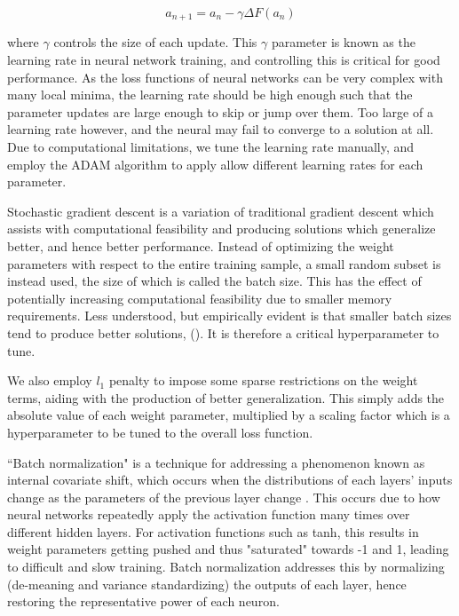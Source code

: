 \documentclass[11pt, a4paper, table]{article}
\begin{document}
\begin{equation}
	a_{n+1} = a_n - \gamma \Delta F(a_n)
\end{equation}

where $\gamma$ controls the size of each update. This $\gamma$ parameter is known as the learning rate in neural network training, and controlling this is critical for good performance. As the loss functions of neural networks can be very complex with many local minima, the learning rate should be high enough such that the parameter updates are large enough to skip or jump over them. Too large of a learning rate however, and the neural may fail to converge to a solution at all. Due to computational limitations, we tune the learning rate manually, and employ the ADAM algorithm to apply allow different learning rates for each parameter.

Stochastic gradient descent is a variation of traditional gradient descent which assists with computational feasibility and producing solutions which generalize better, and hence better performance. Instead of optimizing the weight parameters with respect to the entire training sample, a small random subset is instead used, the size of which is called the batch size. This has the effect of potentially increasing computational feasibility due to smaller memory requirements. Less understood, but empirically evident is that smaller batch sizes tend to produce better solutions, (\cite{keskar_large-batch_2016}). It is therefore a critical hyperparameter to tune.

We also employ $l_1$ penalty to impose some sparse restrictions on the weight terms, aiding with the production of better generalization. This simply adds the absolute value of each weight parameter, multiplied by a scaling factor which is a hyperparameter to be tuned to the overall loss function. 

``Batch normalization" is a technique for addressing a phenomenon known as internal covariate shift, which occurs when the distributions of each layers' inputs change as the parameters of the previous layer change \citep{ioffe_batch_2015}. This occurs due to how neural networks repeatedly apply the activation function many times over different hidden layers. For activation functions such as tanh, this results in weight parameters getting pushed and thus "saturated" towards -1 and 1, leading to difficult and slow training. Batch normalization addresses this by normalizing (de-meaning and variance standardizing) the outputs of each layer, hence restoring the representative power of each neuron.
\end{document}
